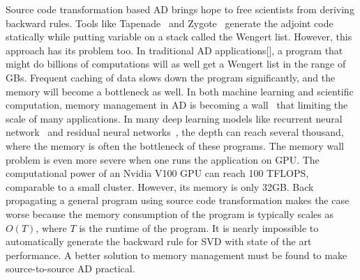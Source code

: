 \documentclass[aps,twocolumn,longbibliography,english,superscriptaddress]{revtex4-1}
\newcommand{\<}{\langle}
\renewcommand{\>}{\rangle}
\newcommand{\blue}[1]{[{\bf  \color{blue}{JG: #1}}]}
\theoremstyle{definition}\newtheorem{definition}{\textit{Definition}}
\begin{document}
    Source code transformation based AD brings hope to free scientists from deriving backward rules.
    Tools like Tapenade~\cite{Hascoet2013} and Zygote~\cite{Innes2018, Innes2019} generate the adjoint code statically while putting variable on a stack called the Wengert list.
    However, this approach has its problem too. In traditional AD applications\blue{what is traditional AD applications}, a program that might do billions of computations will as well get a Wengert list in the range of GBs. Frequent caching of data slows down the program significantly, and the memory will become a bottleneck as well.
In both machine learning and scientific computation, memory management in AD is becoming a wall~\cite{Luo2019} that limiting the scale of many applications.
In many deep learning models like recurrent neural network~\cite{Lipton2015} and residual neural networks~\cite{He2016}, the depth can reach several thousand, where the memory is often the bottleneck of these programs. The memory wall problem is even more severe when one runs the application on GPU. The computational power of an Nvidia V100 GPU can reach 100 TFLOPS, comparable to a small cluster. However, its memory is only 32GB.
Back propagating a general program using source code transformation makes the case worse because the memory consumption of the program is typically scales as $O(T)$, where $T$ is the runtime of the program. It is nearly impossible to automatically generate the backward rule for SVD with state of the art performance. A better solution to memory management must be found to make source-to-source AD practical.
\end{document}
